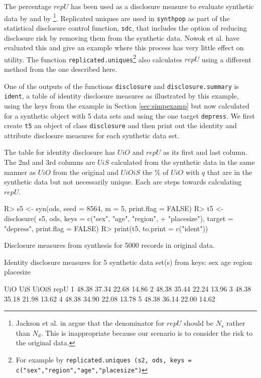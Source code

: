 \documentclass[12pt]{article}
\renewcommand{\baselinestretch}{1.5} %
\begin{document}
The percentage $repU$ has been used as a disclosure measure to evaluate synthetic data by \cite{jackson_rss} and by \cite{raab22} \footnote{Jackson et al. in \cite{jackson_rss} argue that the denominator for $repU$ should be $N_s$ rather than $N_d$. This is inappropriate because our scenario is to consider the risk to the original data.}.
Replicated uniques are used in \texttt{synthpop} as part of the statistical disclosure control function, \texttt{sdc}, that includes the option of reducing disclosure risk by removing them from the synthetic data. Nowok et al. \cite{nowok_repu} have evaluated this and give an example where this process has very little effect on utility. The function \texttt{replicated.uniques}\footnote{For example by \texttt{replicated.uniques (s2, ods, keys = c("sex","region","age","placesize")} } also calculates $repU$ using a different method from the one described here.

One of the outputs of the functions \texttt{disclosure} and \texttt{disclosure.summary} is \texttt{ident}, a table of identity disclosure measures as illustrated by this example, using the keys from the example in Section \ref{sec:simpexamp} but now calculated for a synthetic object with 5 data sets and using the one target \texttt{depress}. We first create \texttt{t5} an object of class \texttt{disclosure} and then print out the identity and attribute disclosure measures for each synthetic data set.

The table for identity disclosure has $UiO$ and $repU$ as its first and last column. The 2nd and 3rd columns are $UiS$ calculated from the synthetic data in the same manner as $UiO$ from the original and $UiOiS$ the \% of $UiO$ with $q$ that are in the synthetic data but not necessarily unique. Each are steps towards calculating $repU$.
\renewcommand{\baselinestretch}{1.0}
\begin{Schunk}
\begin{Sinput}
R> s5 <- syn(ods, seed = 8564, m = 5, print.flag = FALSE)
R> t5 <- disclosure( s5, ods, keys = c("sex", "age", "region",
+    "placesize"), target = "depress", print.flag = FALSE)
R> print(t5, to.print = c("ident"))
\end{Sinput}
\begin{Soutput}
Disclosure measures from synthesis for 5000 records in original data.

Identity disclosure measures for 5 synthetic data set(s) from keys:
 sex age region placesize 

    UiO   UiS UiOiS  repU
1 48.38 37.34 22.68 14.86
2 48.38 35.44 22.24 13.96
3 48.38 35.18 21.98 13.62
4 48.38 34.90 22.08 13.78
5 48.38 36.14 22.00 14.62
\end{Soutput}
\end{Schunk}
\renewcommand{\baselinestretch}{1.5}
\end{document}
